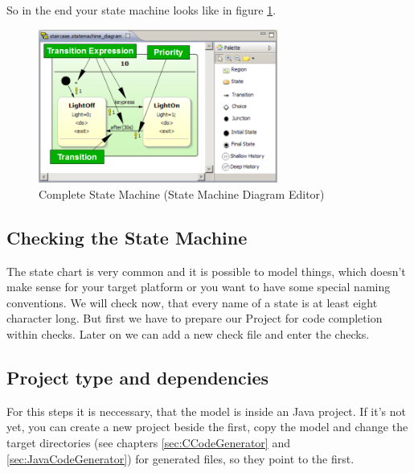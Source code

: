 So in the end your state machine looks like in figure
\ref{fig:statemachineFinish}.

\begin{figure}[ht]
\center
\includegraphics[width=0.7\textwidth]{./Pictures/statemachineFinish_1}
\caption{\label{fig:statemachineFinish}Complete State Machine (State Machine Diagram Editor)}
\end{figure}

\newpage
\subsection{Checking the State Machine}
The state chart is very common and it is possible to model things, which doesn't
make sense for your target platform or you want to have some special naming
conventions. We will check now, that every name of a state is at least eight
character long. But first we have to prepare our Project for code completion
within checks. Later on we can add a new check file and enter the checks.

\subsection{Project type and dependencies}
For this steps it is neccessary, that the model is inside an Java project. If
it's not yet, you can create a new project beside the first, copy the model and
change the target directories (see chapters \ref{sec:CCodeGenerator} and
\ref{sec:JavaCodeGenerator})  for generated files, so they point to the first.

